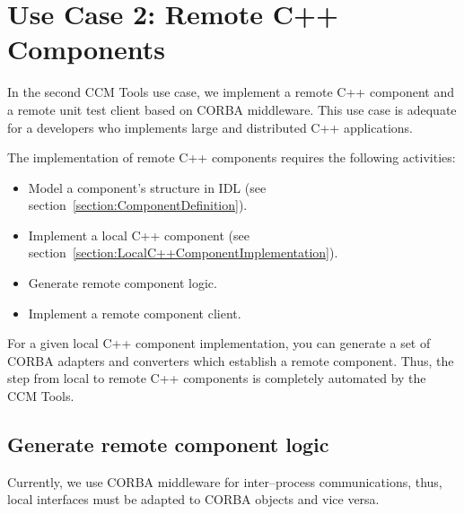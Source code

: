 \section{Use Case 2: Remote C++ Components}
\label{section:RemoteC++ComponentImplementation}

In the second CCM Tools use case, we implement a remote C++ component and a
remote unit test client based on CORBA middleware. 
This use case is adequate for a developers who implements large and distributed
C++ applications.

\vspace{3mm}
The implementation of remote C++ components requires the following activities:
\begin{itemize}
	\item Model a component's structure in IDL 
			(see section~\ref{section:ComponentDefinition}). 
	\item Implement a local C++ component (see section~\ref{section:LocalC++ComponentImplementation}).
	\item Generate remote component logic.
	\item Implement a remote component client.
\end{itemize}

For a given local C++ component implementation, you can generate a set of CORBA
adapters and converters which establish a remote component.
Thus, the step from local to remote C++ components is completely automated by
the CCM Tools.


\subsection{Generate remote component logic}
\label{subsection:GenerateRemoteComponentLogic}

Currently, we use CORBA middleware for inter--process communications, thus, local
interfaces must be adapted to CORBA objects and vice versa.

